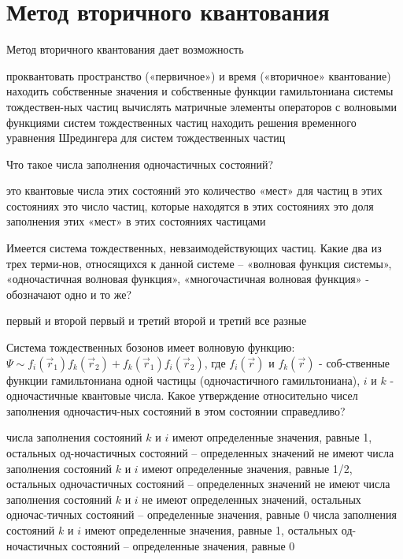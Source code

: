 \documentclass[11pt,a4paper]{exam}
\begin{document}
\section{ Метод вторичного квантования }

\begin{questions}

\question Метод вторичного квантования дает возможность
\begin{choices}
\choice проквантовать пространство («первичное») и время («вторичное» квантование)
\choice находить собственные значения и собственные функции гамильтониана системы тождествен-ных частиц
\choice вычислять матричные элементы операторов с волновыми функциями систем тождественных частиц
\choice находить решения временного уравнения Шредингера для систем тождественных частиц
\end{choices}

\question Что такое числа заполнения одночастичных состояний?
\begin{choices}
\choice это квантовые числа этих состояний
\choice это количество «мест» для частиц в этих состояниях
\choice это число частиц, которые находятся в этих состояниях
\choice это доля заполнения этих «мест» в этих состояниях частицами
\end{choices}

\question Имеется система тождественных, невзаимодействующих частиц. Какие два из трех терми-нов, относящихся к данной системе – «волновая функция системы», «одночастичная волновая функция», «многочастичная волновая функция» - обозначают одно и то же?
\begin{choices}
\choice первый и второй      
\choice первый и третий
\choice второй и третий      
\choice все разные
\end{choices}

\question Система тождественных бозонов имеет волновую функцию: $\Psi  \sim {f_i}({\vec r_1}){f_k}({\vec r_2}) + {f_k}({\vec r_1}){f_i}({\vec r_2})$, где ${f_i}(\vec r)$ и ${f_k}(\vec r)$ - соб-ственные функции гамильтониана одной частицы (одночастичного гамильтониана), $i$ и $k$ - одночастичные квантовые числа. Какое утверждение относительно чисел заполнения одночастич-ных состояний в этом состоянии справедливо?
\begin{choices}
\choice числа заполнения состояний $k$ и $i$ имеют определенные значения, равные 1, остальных од-ночастичных состояний – определенных значений не имеют
\choice числа заполнения состояний $k$ и $i$ имеют определенные значения, равные 1/2, остальных одночастичных состояний – определенных значений не имеют
\choice числа заполнения состояний $k$ и $i$ не имеют определенных значений, остальных одночас-тичных состояний – определенные значения, равные 0
\choice числа заполнения состояний $k$ и $i$ имеют определенные значения, равные 1, остальных од-ночастичных состояний – определенные значения, равные 0
\end{choices}


\end{questions}
\end{document}
